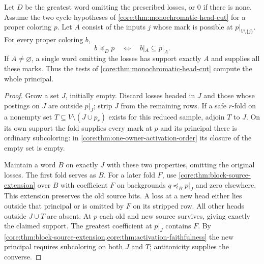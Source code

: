 \begin{corollary}
\label{core:cor:monochromatic-principal-box}
Let $D$ be the greatest word omitting the prescribed losses, or $0$ if
there is none. Assume the two cycle hypotheses of
\cref{core:thm:monochromatic-head-cut} for a proper coloring $p$.
Let $A$ consist of the inputs $j$ whose mark is possible at
$p|_{V\setminus\{j\}}$. For every proper coloring $b$,
\[
             b\preceq_D p\quad\Longleftrightarrow\quad
                    b|_A\subseteq p|_A .
\]
If $A\ne\varnothing$, a single word omitting the losses has support
exactly $A$ and supplies all these marks. Thus the tests of
\cref{core:thm:monochromatic-head-cut} compute the whole principal.
\end{corollary}
\begin{proof}
Grow a set $J$, initially empty. Discard losses headed in $J$ and
those whose postings on $J$ are outside $p|_J$; strip $J$ from the
remaining rows. If a safe $r$-fold on a nonempty set
$T\subseteq V\setminus(J\cup p_r)$ exists for this reduced sample,
adjoin $T$ to $J$. On its own support the fold supplies every mark
at $p$ and its principal there is ordinary subcoloring:
in \cref{core:thm:one-owner-activation-order} its closure of the
empty set is empty.

Maintain a word $B$ on exactly $J$ with these two properties,
omitting the original losses. The first fold serves as $B$. For a
later fold $F$, use \cref{core:thm:block-source-extension} over $B$
with coefficient $F$ on backgrounds $q\preceq_B p|_J$ and zero
elsewhere. This extension preserves the old source bits. A loss at
a new head either lies outside that principal or is omitted by $F$
on its stripped row. All other heads outside $J\cup T$ are absent.
At $p$ each old and new source survives, giving exactly the claimed
support. The greatest coefficient at $p|_J$ contains $F$.
By \cref{core:thm:block-source-extension,core:thm:activation-faithfulness}
the new principal requires subcoloring on both $J$ and $T$;
antitonicity supplies the converse.


\end{proof}
